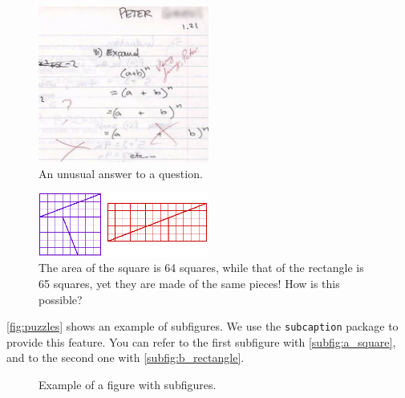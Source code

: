 \documentclass{scspaperproc}
\theoremstyle{scsthe}
\begin{document}
\begin{figure}[htb]
{
\centering
\includegraphics[width=0.50\textwidth]{assets/MathExpandExpression}
\caption{An unusual answer to a question.}\label{fig:tahi}
}
\end{figure}

\begin{figure}[htb]
{
\centering
\includegraphics[width=0.50\textwidth]{assets/puzzle}
\caption{The area of the square is 64 squares, while that of the rectangle is 65 squares, yet they are made of the same pieces! How
is this possible?}\label{fig:rua}
}
\end{figure}

\autoref{fig:puzzles} shows an example of subfigures.
We use the \texttt{subcaption} package to provide this feature.
You can refer to the first subfigure with \autoref{subfig:a_square}, and to the second one with \autoref{subfig:b_rectangle}.

\begin{figure}[ht]
     \centering
     \caption{Example of a figure with subfigures.}
     \label{fig:puzzles}
\end{figure}
\end{document}
